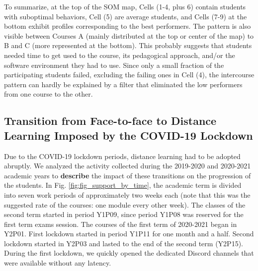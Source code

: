 \documentclass{aims}
\theoremstyle{definition}
\begin{document}
To summarize, at the top of the SOM map, Cells (1-4, plus 6) contain
students with suboptimal behaviors, Cell (5) are average students, and
Cells (7-9) at the bottom exhibit profiles corresponding to the best
performers. The pattern is also visible between Courses A (mainly
distributed at the top or center of the map) to B and C (more
represented at the bottom). This probably suggests that students needed
time to get used to the course, its pedagogical approach, and/or the
software environment they had to use. Since only a small fraction of the
participating students failed, excluding the failing ones in Cell (4),
the intercourse pattern can hardly be explained by a filter that
eliminated the low performers from one course to the other.

\hypertarget{transition-from-face-to-face-to-distance-learning-imposed-by-the-covid-19-lockdown-1}{%
\subsection{Transition from Face-to-face to Distance Learning Imposed by
the COVID-19
Lockdown}\label{transition-from-face-to-face-to-distance-learning-imposed-by-the-covid-19-lockdown-1}}

Due to the COVID-19 lockdown periods, distance learning had to be
adopted abruptly. We analyzed the activity collected during the
2019-2020 and 2020-2021 academic years to \textbf{describe} the impact
of these transitions on the progression of the students. In Fig.
\ref{fig:fig_support_by_time}, the academic term is divided into seven
work periods of approximately two weeks each (note that this was the
suggested rate of the courses: one module every other week). The classes
of the second term started in period Y1P09, since period Y1P08 was
reserved for the first term exams session. The courses of the first term
of 2020-2021 began in Y2P01. First lockdown started in period Y1P11 for
one month and a half. Second lockdown started in Y2P03 and lasted to the
end of the second term (Y2P15). During the first lockdown, we quickly
opened the dedicated Discord channels that were available without any
latency.
\end{document}
